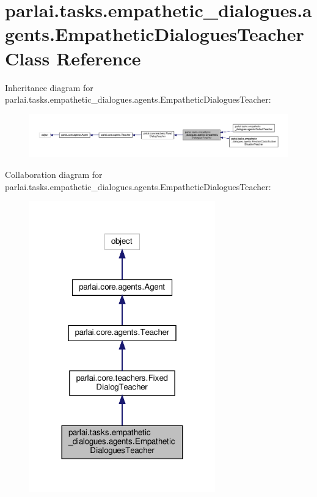 \hypertarget{classparlai_1_1tasks_1_1empathetic__dialogues_1_1agents_1_1EmpatheticDialoguesTeacher}{}\section{parlai.\+tasks.\+empathetic\+\_\+dialogues.\+agents.\+Empathetic\+Dialogues\+Teacher Class Reference}
\label{classparlai_1_1tasks_1_1empathetic__dialogues_1_1agents_1_1EmpatheticDialoguesTeacher}


Inheritance diagram for parlai.\+tasks.\+empathetic\+\_\+dialogues.\+agents.\+Empathetic\+Dialogues\+Teacher\+:
\nopagebreak
\begin{figure}[H]
\begin{center}
\leavevmode
\includegraphics[width=350pt]{db/d4a/classparlai_1_1tasks_1_1empathetic__dialogues_1_1agents_1_1EmpatheticDialoguesTeacher__inherit__graph}
\end{center}
\end{figure}


Collaboration diagram for parlai.\+tasks.\+empathetic\+\_\+dialogues.\+agents.\+Empathetic\+Dialogues\+Teacher\+:
\nopagebreak
\begin{figure}[H]
\begin{center}
\leavevmode
\includegraphics[width=228pt]{dc/d47/classparlai_1_1tasks_1_1empathetic__dialogues_1_1agents_1_1EmpatheticDialoguesTeacher__coll__graph}
\end{center}
\end{figure}
